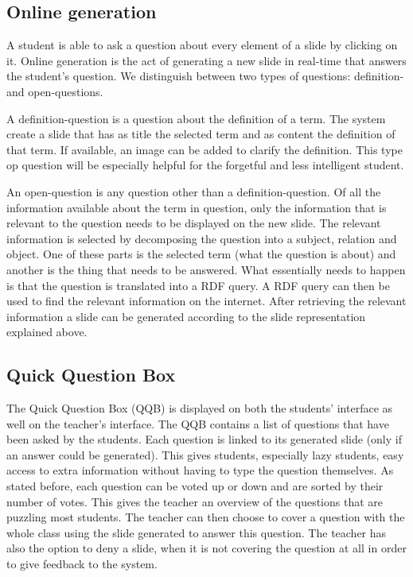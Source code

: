 \documentclass[11pt]{article}
\begin{document}
\subsection{Online generation}
A student is able to ask a question about every element of a slide by clicking on it. Online generation is the act of generating a new slide in real-time that answers the student’s question. We distinguish between two types of questions: definition- and open-questions.

A definition-question is a question about the definition of a term. The system create a slide that has as title the selected term and as content the definition of that term. If available, an image can be added to clarify the definition. This type op question will be especially helpful for the forgetful and less intelligent student. 

An open-question is any question other than a definition-question. Of all the information available about the term in question, only the information that is relevant to the question needs to be displayed on the new slide. The relevant information is selected by decomposing the question into a subject, relation and object. One of these parts is the selected term (what the question is about) and another is the thing that needs to be answered. What essentially needs to happen is that the question is translated into a RDF query. A RDF query can then be used to find the relevant information on the internet. After retrieving the relevant information a slide can be generated according to the slide representation explained above.

\subsection{Quick Question Box}
The Quick Question Box (QQB) is displayed on both the students’ interface as well on the teacher’s interface. The QQB contains a list of questions that have been asked by the students. Each question is linked to its generated slide (only if an answer could be generated). This gives students, especially lazy students, easy access to extra information without having to type the question themselves. As stated before, each question can be voted up or down and are sorted by their number of votes. This gives the teacher an overview of the questions that are puzzling most students. The teacher can then choose to cover a question with the whole class using the slide generated to answer this question. The teacher has also the option to deny a slide, when it is not covering the question at all in order to give feedback to the system.
\end{document}
